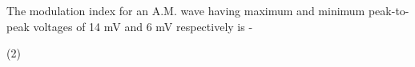 \item The modulation index for an A.M. wave having maximum and minimum peak-to-peak voltages of 14 mV and 6 mV respectively is -
    \begin{tasks}(2)
    \end{tasks}